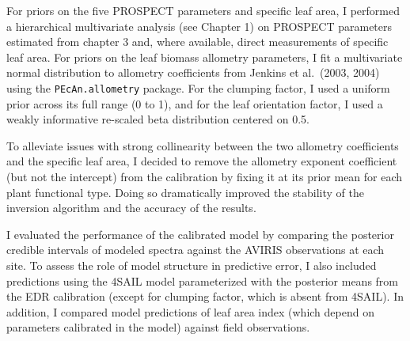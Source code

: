 For priors on the five PROSPECT parameters and specific leaf area, I performed a hierarchical multivariate analysis (see Chapter 1) on PROSPECT parameters estimated from chapter 3 and, where available, direct measurements of specific leaf area. 
For priors on the leaf biomass allometry parameters, I fit a multivariate normal distribution to allometry coefficients from Jenkins et al.~(2003, 2004) using the \texttt{PEcAn.allometry} package. \nocite{jenkins_2003_allom,jenkins_2004_allom} 
For the clumping factor, I used a uniform prior across its full range (0 to 1), and for the leaf orientation factor, I used a weakly informative re-scaled beta distribution centered on 0.5.

To alleviate issues with strong collinearity between the two allometry coefficients and the specific leaf area, I decided to remove the allometry exponent coefficient (but not the intercept) from the calibration by fixing it at its prior mean for each plant functional type.
Doing so dramatically improved the stability of the inversion algorithm and the accuracy of the results.

I evaluated the performance of the calibrated model by comparing the posterior credible intervals of modeled spectra against the AVIRIS observations at each site.
To assess the role of model structure in predictive error, I also included predictions using the 4SAIL model parameterized with the posterior means from the EDR calibration (except for clumping factor, which is absent from 4SAIL).
In addition, I compared model predictions of leaf area index (which depend on parameters calibrated in the model) against field observations.

